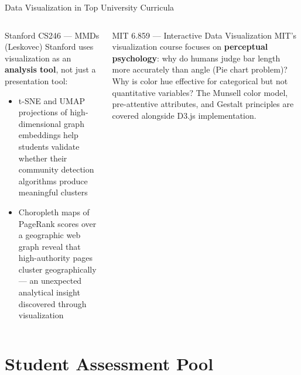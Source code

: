 \documentclass[aspectratio=169,10pt]{beamer}
\begin{document}
\begin{frame}{Data Visualization in Top University Curricula}
\begin{columns}[T]
      \begin{exampleblock}{Stanford CS246 — MMDs (Leskovec)}
        \small Stanford uses visualization as an \textbf{analysis tool}, not just a presentation tool:
        \begin{itemize}
          \item t-SNE and UMAP projections of high-dimensional graph embeddings help students validate whether their community detection algorithms produce meaningful clusters
          \item Choropleth maps of PageRank scores over a geographic web graph reveal that high-authority pages cluster geographically --- an unexpected analytical insight discovered through visualization
        \end{itemize}
      \end{exampleblock}
      \vspace{4pt}
      \begin{alertblock}{MIT 6.859 — Interactive Data Visualization}
        \small MIT's visualization course focuses on \textbf{perceptual psychology}: why do humans judge bar length more accurately than angle (Pie chart problem)?  Why is color hue effective for categorical but not quantitative variables?  The Munsell color model, pre-attentive attributes, and Gestalt principles are covered alongside D3.js implementation.
      \end{alertblock}
  \end{columns}
\end{frame}

\section{Student Assessment Pool}
\end{document}
